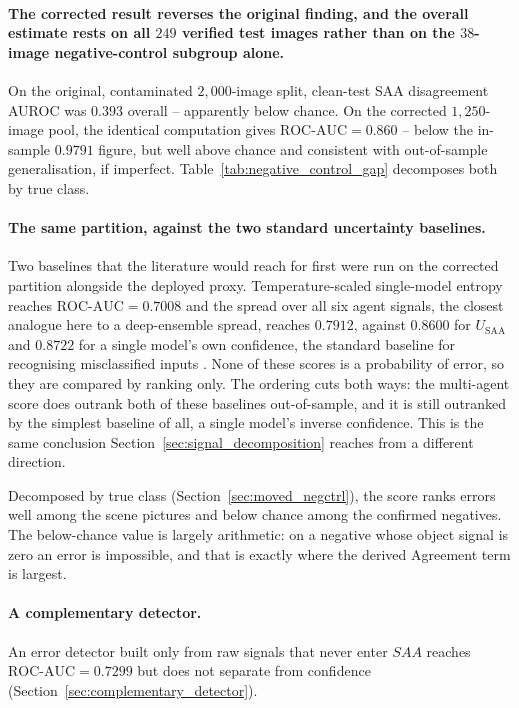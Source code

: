 \documentclass[12pt,a4paper]{report}
\begin{document}
\paragraph{The corrected result reverses the original finding, and the overall estimate rests on all $249$ verified test images rather than on the $38$-image negative-control subgroup alone.} On the original, contaminated $2{,}000$-image split, clean-test SAA disagreement AUROC was $0.393$ overall -- apparently below chance. On the corrected $1{,}250$-image pool, the identical computation gives $\text{ROC-AUC}=0.860$ -- below the in-sample $0.9791$ figure, but well above chance and consistent with out-of-sample generalisation, if imperfect. Table~\ref{tab:negative_control_gap} decomposes both by true class.

\paragraph{The same partition, against the two standard uncertainty baselines.} Two baselines that the literature would reach for first were run on the corrected partition alongside the deployed proxy. Temperature-scaled single-model entropy reaches $\text{ROC-AUC}=0.7008$ and the spread over all six agent signals, the closest analogue here to a deep-ensemble spread, reaches $0.7912$, against $0.8600$ for $U_{\text{SAA}}$ and $0.8722$ for a single model's own confidence, the standard baseline for recognising misclassified inputs \cite{hendrycks2017baseline}. None of these scores is a probability of error, so they are compared by ranking only. The ordering cuts both ways: the multi-agent score does outrank both of these baselines out-of-sample, and it is still outranked by the simplest baseline of all, a single model's inverse confidence. This is the same conclusion Section~\ref{sec:signal_decomposition} reaches from a different direction.

Decomposed by true class (Section~\ref{sec:moved_negctrl}), the score ranks errors well among the scene pictures and below chance among the confirmed negatives. The below-chance value is largely arithmetic: on a negative whose object signal is zero an error is impossible, and that is exactly where the derived Agreement term is largest.

\paragraph{A complementary detector.} An error detector built only from raw signals that never enter $SAA$ reaches $\text{ROC-AUC}=0.7299$ but does not separate from confidence (Section~\ref{sec:complementary_detector}).
\end{document}

